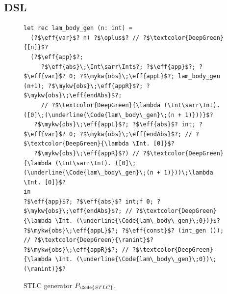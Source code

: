 
\subsection{DSL}

\newcommand{\ranint}{\underline{\Code{int\_gen\;()}}}

\begin{figure}
\centering
\begin{verbatim}
let rec lam_body_gen (n: int) =
  (?$\eff{var}$? n) ?$\oplus$? // ?$\textcolor{DeepGreen}{[n]}$?
  (?$\eff{app}$?;
     ?$\eff{abs}\;\Int\sarr\Int$?; ?$\eff{app}$?; ?$\eff{var}$? 0; ?$\mykw{obs}\;\eff{appL}$?; lam_body_gen (n+1); ?$\mykw{obs}\;\eff{appR}$?; ?$\mykw{obs}\;\eff{endAbs}$?;
     // ?$\textcolor{DeepGreen}{\lambda (\Int\sarr\Int). ([0]\;(\underline{\Code{lam\_body\_gen}\;(n + 1)}))}$?
   ?$\mykw{obs}\;\eff{appL}$?; ?$\eff{abs}$? int; ?$\eff{var}$? 0; ?$\mykw{obs}\;\eff{endAbs}$?; // ?$\textcolor{DeepGreen}{\lambda \Int. [0]}$?
   ?$\mykw{obs}\;\eff{appR}$?) // ?$\textcolor{DeepGreen}{\lambda (\Int\sarr\Int). ([0]\;(\underline{\Code{lam\_body\_gen}\;(n + 1)}))\;\lambda \Int. [0]}$?
in
?$\eff{app}$?; ?$\eff{abs}$? int;f 0; ?$\mykw{obs}\;\eff{endAbs}$?; // ?$\textcolor{DeepGreen}{\lambda \Int. (\underline{\Code{lam\_body\_gen}\;0})}$?
?$\mykw{obs}\;\eff{appL}$?; ?$\eff{const}$? (int_gen ()); // ?$\textcolor{DeepGreen}{\ranint}$?
?$\mykw{obs}\;\eff{appR}$?; // ?$\textcolor{DeepGreen}{\lambda \Int. (\underline{\Code{lam\_body\_gen}\;0})\;(\ranint)}$?
\end{verbatim}
\vspace*{-.1in}
\caption{STLC generator $P_\Code{STLC}$. }\label{fig:stlc-gen}
\vspace*{-.2in}
\end{figure}

